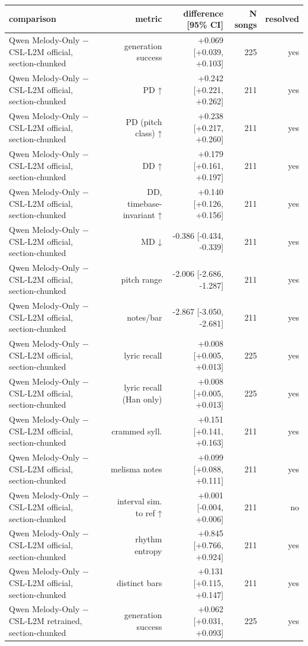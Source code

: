 \begin{table}[t]
\centering
\small
\begin{tabular}{lrrrr}
\toprule
comparison & metric & difference [95\% CI] & N songs & resolved \\
\midrule
Qwen Melody-Only $-$ CSL-L2M official, section-chunked & generation success & +0.069 [+0.039, +0.103] & 225 & yes \\
Qwen Melody-Only $-$ CSL-L2M official, section-chunked & PD ↑ & +0.242 [+0.221, +0.262] & 211 & yes \\
Qwen Melody-Only $-$ CSL-L2M official, section-chunked & PD (pitch class) ↑ & +0.238 [+0.217, +0.260] & 211 & yes \\
Qwen Melody-Only $-$ CSL-L2M official, section-chunked & DD ↑ & +0.179 [+0.161, +0.197] & 211 & yes \\
Qwen Melody-Only $-$ CSL-L2M official, section-chunked & DD, timebase-invariant ↑ & +0.140 [+0.126, +0.156] & 211 & yes \\
Qwen Melody-Only $-$ CSL-L2M official, section-chunked & MD ↓ & -0.386 [-0.434, -0.339] & 211 & yes \\
Qwen Melody-Only $-$ CSL-L2M official, section-chunked & pitch range & -2.006 [-2.686, -1.287] & 211 & yes \\
Qwen Melody-Only $-$ CSL-L2M official, section-chunked & notes/bar & -2.867 [-3.050, -2.681] & 211 & yes \\
Qwen Melody-Only $-$ CSL-L2M official, section-chunked & lyric recall & +0.008 [+0.005, +0.013] & 225 & yes \\
Qwen Melody-Only $-$ CSL-L2M official, section-chunked & lyric recall (Han only) & +0.008 [+0.005, +0.013] & 225 & yes \\
Qwen Melody-Only $-$ CSL-L2M official, section-chunked & crammed syll. & +0.151 [+0.141, +0.163] & 211 & yes \\
Qwen Melody-Only $-$ CSL-L2M official, section-chunked & melisma notes & +0.099 [+0.088, +0.111] & 211 & yes \\
Qwen Melody-Only $-$ CSL-L2M official, section-chunked & interval sim. to ref ↑ & +0.001 [-0.004, +0.006] & 211 & no \\
Qwen Melody-Only $-$ CSL-L2M official, section-chunked & rhythm entropy & +0.845 [+0.766, +0.924] & 211 & yes \\
Qwen Melody-Only $-$ CSL-L2M official, section-chunked & distinct bars & +0.131 [+0.115, +0.147] & 211 & yes \\
Qwen Melody-Only $-$ CSL-L2M retrained, section-chunked & generation success & +0.062 [+0.031, +0.093] & 225 & yes \\

\end{tabular}
\end{table}
